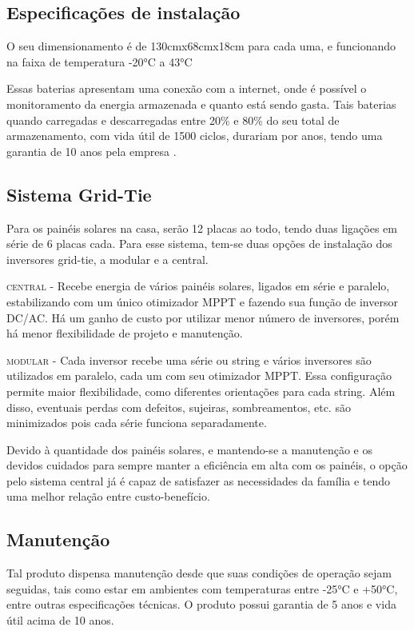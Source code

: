\subsection{Especificações de instalação}

	O seu dimensionamento é de 130cmx68cmx18cm para cada uma, e funcionando na faixa de temperatura -20\si{\celsius} a 43\si{\celsius} \cite{TESLA}

	Essas baterias apresentam uma conexão com a internet, onde é possível o monitoramento da energia armazenada e quanto está sendo gasta. Tais baterias quando carregadas e descarregadas entre 20\% e 80\% do seu total de armazenamento, com vida útil de 1500 ciclos, durariam por anos, tendo uma garantia de 10 anos pela empresa \cite{TESLA}.

\subsection{Sistema Grid-Tie}

	Para os painéis solares na casa, serão 12 placas ao todo, tendo duas ligações em série de 6 placas cada. Para esse sistema, tem-se duas opções de instalação dos inversores grid-tie, a modular e a central.

	\textsc{central} - Recebe energia de vários painéis solares, ligados em série e paralelo, estabilizando com um único otimizador MPPT e fazendo sua função de inversor DC/AC. Há um ganho de custo por utilizar menor número de inversores, porém há menor flexibilidade de projeto e manutenção.

	\textsc{modular} - Cada inversor recebe uma série ou string e vários inversores são utilizados em paralelo, cada um com seu otimizador MPPT. Essa configuração permite maior flexibilidade, como diferentes orientações para cada string. Além disso, eventuais perdas com defeitos, sujeiras, sombreamentos, etc. são minimizados pois cada série funciona separadamente.

	Devido à quantidade dos painéis solares, e mantendo-se a manutenção e os devidos cuidados para sempre manter a eficiência em alta com os painéis, o opção pelo sistema central já é capaz de satisfazer as necessidades da família e tendo uma melhor relação entre custo-benefício.

\subsection{Manutenção}

	Tal produto dispensa manutenção desde que suas condições de operação sejam seguidas, tais como estar em ambientes com temperaturas entre -25\si{\celsius} e +50\si{\celsius}, entre outras especificações técnicas. O produto possui garantia de 5 anos e vida útil acima de 10 anos\cite{neosolarKitGerador}.

